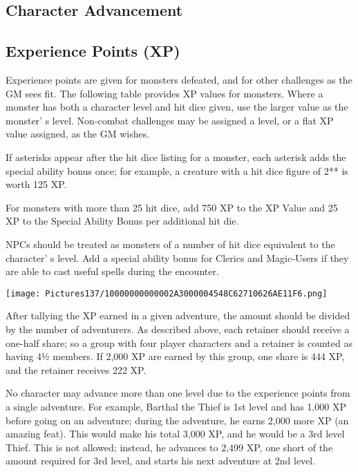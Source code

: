 \documentclass[a4paper,twoside,openany,10pt]{book}
\begin{document}
\subsection{Character Advancement}\label{character-advancement}

\begin{multicols}{2}

\subsection{Experience Points (XP)}\label{experience-points-xp}

Experience points are given for monsters defeated, and for other challenges as the GM sees fit. The following table provides XP values for monsters. Where a monster has both a character level and hit dice given, use the larger value as the monster' s level. Non-combat challenges may be assigned a level, or a flat XP value assigned, as the GM wishes.

If asterisks appear after the hit dice listing for a monster, each asterisk adds the special ability bonus once; for example, a creature with a hit dice figure of 2** is worth 125 XP.

For monsters with more than 25 hit dice, add 750 XP to the XP Value and 25 XP to the Special Ability Bonus per additional hit die. 

NPCs should be treated as monsters of a number of hit dice equivalent to the character' s level. Add a special ability bonus for Clerics and Magic-Users if they are able to cast useful spells during the encounter.


\begin{flushleft}
	\texttt{[image: Pictures137/10000000000002A3000004548C62710626AE11F6.png]}
\end{flushleft}

After tallying the XP earned in a given adventure, the amount should be divided by the number of adventurers. As described above, each retainer should receive a one-half share; so a group with four player characters and a retainer is counted as having 4½ members. If 2,000 XP are earned by this group, one share is 444 XP, and the retainer receives 222 XP. 

No character may advance more than one level due to the experience points from a single adventure. For example, Barthal the Thief is 1st level and has 1,000 XP before going on an adventure; during the adventure, he earns 2,000 more XP (an amazing feat). This would make his total 3,000 XP, and he would be a 3rd level Thief. This is not allowed; instead, he advances to 2,499 XP, one short of the amount required for 3rd level, and starts his next adventure at 2nd level.\\\medskip


\end{multicols}
\end{document}
